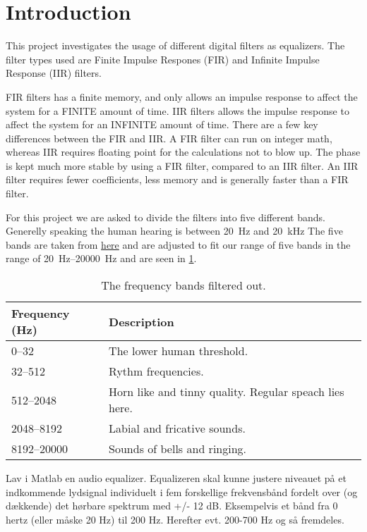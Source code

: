 
\section{Introduction}
This project investigates the usage of different digital filters as equalizers. The filter types used are Finite Impulse Respones (FIR) and Infinite Impulse Response (IIR) filters.

FIR filters has a finite memory, and only allows an impulse response to affect the system for a FINITE amount of time.
IIR filters allows the impulse response to affect the system for an INFINITE amount of time.
There are a few key differences between the FIR and IIR.
A FIR filter can run on integer math, whereas IIR requires floating point for the calculations not to blow up. The phase is kept much more stable by using a FIR filter, compared to an IIR filter.
An IIR filter requires fewer coefficients, less memory and is generally faster than a FIR filter.

For this project we are asked to divide the filters into five different bands. Generelly speaking the human hearing is between \SI{20}{\hertz} and \SI{20}{\kilo\hertz} The five bands are taken from \href{https://en.wikipedia.org/wiki/Audio\_frequency}{here} and are adjusted to fit our range of five bands in the range of \SIrange{20}{20000}{\hertz} and are seen in \cref{tab:FiveBand}.

\begin{table}[h]
	\caption{The frequency bands filtered out.}
	\label{tab:FiveBand}
	\begin{tabularx}{\textwidth}{X X}
		\textbf{Frequency} (\si{\hertz})	& \textbf{Description} \\
		\toprule
		\numrange{0}{32}		& The lower human threshold. \\
		\numrange{32}{512}		& Rythm frequencies. \\
		\numrange{512}{2048}	& Horn like and tinny quality. Regular speach lies here. \\
		\numrange{2048}{8192}	& Labial and fricative sounds. \\
		\numrange{8192}{20000}	& Sounds of bells and ringing. \\
	\end{tabularx}
\end{table}

Lav i Matlab en audio equalizer. Equalizeren skal kunne justere niveauet på et indkommende lydsignal individuelt i fem forskellige frekvensbånd fordelt over (og dækkende) det hørbare spektrum med +/- 12 dB. Eksempelvis et bånd fra 0 hertz (eller måske 20 Hz) til 200 Hz. Herefter evt. 200-700 Hz og så fremdeles.

